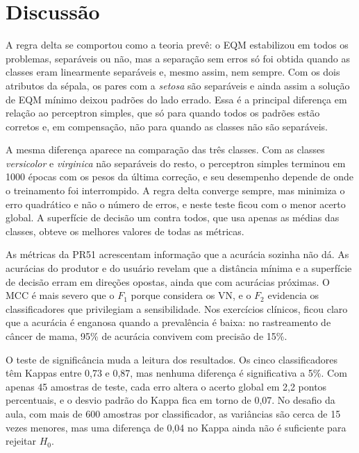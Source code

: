 \documentclass[12pt,a4paper]{article}
\newcommand{\setosa}{\emph{setosa}}
\newcommand{\versicolor}{\emph{versicolor}}
\newcommand{\virginica}{\emph{virginica}}
\begin{document}
\section{Discussão}

A regra delta se comportou como a teoria prevê: o EQM estabilizou em todos os problemas, separáveis ou não, mas a separação sem erros só foi obtida quando as classes eram linearmente separáveis e, mesmo assim, nem sempre. Com os dois atributos da sépala, os pares com a \setosa{} são separáveis e ainda assim a solução de EQM mínimo deixou padrões do lado errado. Essa é a principal diferença em relação ao perceptron simples, que só para quando todos os padrões estão corretos e, em compensação, não para quando as classes não são separáveis.

A mesma diferença aparece na comparação das três classes. Com as classes \versicolor{} e \virginica{} não separáveis do resto, o perceptron simples terminou em 1000 épocas com os pesos da última correção, e seu desempenho depende de onde o treinamento foi interrompido. A regra delta converge sempre, mas minimiza o erro quadrático e não o número de erros, e neste teste ficou com o menor acerto global. A superfície de decisão um contra todos, que usa apenas as médias das classes, obteve os melhores valores de todas as métricas.

As métricas da PR51 acrescentam informação que a acurácia sozinha não dá. As acurácias do produtor e do usuário revelam que a distância mínima e a superfície de decisão erram em direções opostas, ainda que com acurácias próximas. O MCC é mais severo que o $F_1$ porque considera os VN, e o $F_2$ evidencia os classificadores que privilegiam a sensibilidade. Nos exercícios clínicos, ficou claro que a acurácia é enganosa quando a prevalência é baixa: no rastreamento de câncer de mama, 95\% de acurácia convivem com precisão de 15\%.

O teste de significância muda a leitura dos resultados. Os cinco classificadores têm Kappas entre 0,73 e 0,87, mas nenhuma diferença é significativa a 5\%. Com apenas 45 amostras de teste, cada erro altera o acerto global em 2,2 pontos percentuais, e o desvio padrão do Kappa fica em torno de 0,07. No desafio da aula, com mais de 600 amostras por classificador, as variâncias são cerca de 15 vezes menores, mas uma diferença de 0,04 no Kappa ainda não é suficiente para rejeitar $H_0$.
\end{document}
